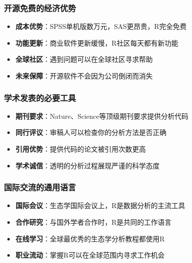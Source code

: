 \documentclass[
  twoside]{book}
\providecommand{\tightlist}{%
  \setlength{\itemsep}{0pt}\setlength{\parskip}{0pt}}
\begin{document}
\hypertarget{ux5f00ux6e90ux514dux8d39ux7684ux7ecfux6d4eux4f18ux52bf}{%
\subsubsection{开源免费的经济优势}\label{ux5f00ux6e90ux514dux8d39ux7684ux7ecfux6d4eux4f18ux52bf}}

\begin{itemize}
\tightlist
\item
  \textbf{成本优势}：SPSS单机版数万元，SAS更昂贵，R完全免费
\item
  \textbf{功能更新}：商业软件更新缓慢，R社区每天都有新功能
\item
  \textbf{全球社区}：遇到问题可以在全球社区寻求帮助
\item
  \textbf{未来保障}：开源软件不会因为公司倒闭而消失
\end{itemize}

\hypertarget{ux5b66ux672fux53d1ux8868ux7684ux5fc5ux8981ux5de5ux5177}{%
\subsubsection{学术发表的必要工具}\label{ux5b66ux672fux53d1ux8868ux7684ux5fc5ux8981ux5de5ux5177}}

\begin{itemize}
\tightlist
\item
  \textbf{期刊要求}：Nature、Science等顶级期刊要求提供分析代码
\item
  \textbf{同行评议}：审稿人可以检查你的分析方法是否正确
\item
  \textbf{引用优势}：提供代码的论文被引用次数更高
\item
  \textbf{学术诚信}：透明的分析过程展现严谨的科学态度
\end{itemize}

\hypertarget{ux56fdux9645ux4ea4ux6d41ux7684ux901aux7528ux8bedux8a00}{%
\subsubsection{国际交流的通用语言}\label{ux56fdux9645ux4ea4ux6d41ux7684ux901aux7528ux8bedux8a00}}

\begin{itemize}
\tightlist
\item
  \textbf{国际会议}：生态学国际会议上，R是数据分析的主流工具
\item
  \textbf{合作研究}：与国外学者合作时，R是共同的工作语言
\item
  \textbf{在线学习}：全球最优秀的生态学分析教程都使用R
\item
  \textbf{职业流动}：掌握R可以在全球范围内寻求工作机会
\end{itemize}
\end{document}
